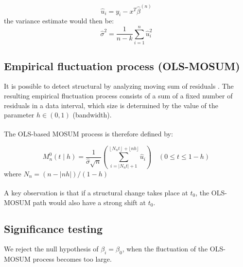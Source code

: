 \documentclass[main.tex]{subfiles}
\begin{document}
\begin{equation} \label{eq:residuals}
\hat{u}_i = y_i - x^T\hat{\beta}^{(n)}
\end{equation}
the variance estimate would then be:
\begin{equation} \label{eq:sigma}
\hat{\sigma}^{2}=\frac{1}{n-k} \sum_{i=1}^{n} \hat{u}_{i}^{2}
\end{equation}

\subsection{Empirical fluctuation process (OLS-MOSUM)}
\label{subsec:empirical_fluctuation}
It is possible to detect structural by analyzing moving sum of residuals
\cite{strucchange}. The resulting empirical fluctuation process consists of a
sum of a fixed number of residuals in a data interval, which size is determined
by the value of the parameter $h \in (0,1)$ (bandwidth).\\\\
The OLS-based MOSUM process is therefore defined by:

\begin{equation} \label{eq:mosum}
M_{n}^{0}(t \mid h)=\frac{1}{\hat{\sigma} \sqrt{n}}
\left(\sum_{i=\left|N_{n} t\right|+1}^{\left\lfloor N_{n} t\right\rfloor+\lfloor
  n h\rfloor} \hat{u}_{i}\right) \quad(0 \leq t \leq 1-h)
\end{equation}
where $N_{n}=(n-|n h|) /(1-h)$\\\\
A key observation is that if a structural change takes place at $t_0$, the
OLS-MOSUM path would also have a strong shift at $t_0$.

\subsection{Significance testing}
\label{subsec:significance_testing}
We reject the null hypothesis of $\beta_i = \beta_0$, when the fluctuation of
the OLS-MOSUM process becomes too large.  
\end{document}
